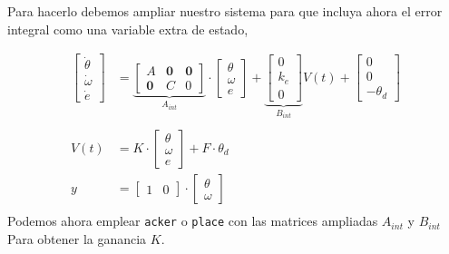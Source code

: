 \documentclass[10pt,a4paper]{report}
\begin{document}
Para hacerlo debemos ampliar nuestro sistema para que incluya ahora el error integral como una variable extra de estado,

\begin{align}
\begin{bmatrix}
\dot{\theta}\\
\dot{\omega}\\
\dot{e}
\end{bmatrix} &= \underbrace{\begin{bmatrix}
A & \mathbf{0} & \mathbf{0}\\
\mathbf{0} & C & 0
\end{bmatrix}}_{A_{int}}\cdot\begin{bmatrix}
\theta\\
\omega\\
e 
\end{bmatrix}+\underbrace{\begin{bmatrix}
0\\
k_e\\
0
\end{bmatrix}}_{B_{int}}V(t)+ \begin{bmatrix}
0\\
0\\
-\theta_d
\end{bmatrix}\\ \label{eq508}\\
V(t) &= K\cdot\begin{bmatrix}
\theta\\
\omega\\
e
\end{bmatrix}+ F\cdot \theta_d\\
y &= \begin{bmatrix}
1& 0
\end{bmatrix}\cdot\begin{bmatrix}
\theta\\
\omega
\end{bmatrix} \\
\end{align}
Podemos ahora emplear \texttt{acker} o \texttt{place} con las matrices ampliadas $A_{int}$ y $B_{int}$ Para obtener la ganancia $K$.
\end{document}
